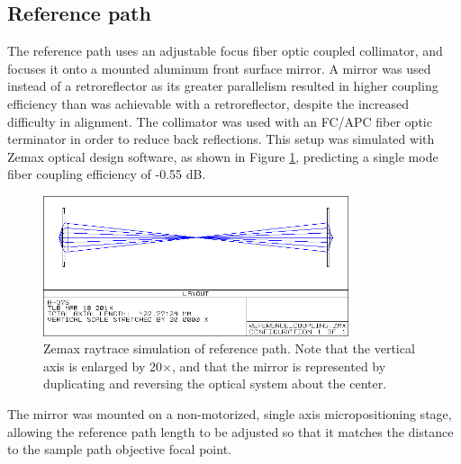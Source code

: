 \subsection{Reference path}
\label{sec:reference_path}


The reference path uses an adjustable focus fiber optic coupled collimator, and focuses it onto a mounted aluminum front surface mirror. A mirror was used instead of a retroreflector as its greater parallelism resulted in higher coupling efficiency than was achievable with a retroreflector, despite the increased difficulty in alignment. The collimator was used with an FC/APC fiber optic terminator in order to reduce back reflections. %
This setup was simulated with Zemax optical design software, as shown in Figure \ref{fig:reference_zemax}, predicting a single mode fiber coupling efficiency of -0.55 dB.%

\begin{figure}[h!]
\centering
\includegraphics[width=0.8\textwidth]{Images/Zemax/RP-raytrace.png}
\caption[Zemax raytrace simulation of reference path.]{Zemax raytrace simulation of reference path. Note that the vertical axis is enlarged by 20$\times$, and that the mirror is represented by duplicating and reversing the optical system about the center.\label{fig:reference_zemax}}
\end{figure}

The mirror was mounted on a non-motorized, single axis micropositioning stage, allowing the reference path length to be adjusted so that it matches the distance to the sample path objective focal point.


